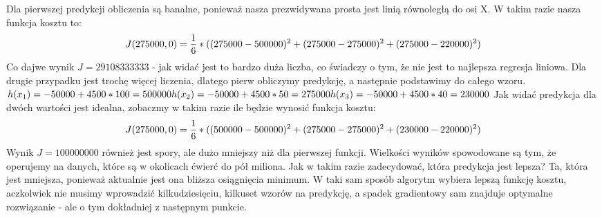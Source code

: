 \newpage
\noindent
Dla pierwszej predykcji obliczenia są banalne, ponieważ nasza prezwidywana prosta jest linią równoległą do osi X. W takim razie nasza funkcja kosztu to:
$$
	J(275000, 0) = \frac{1}{6}*((275000-500000)^{2}+(275000-275000)^{2}+(275000-220000)^{2}) \\
$$
Co dajwe wynik $J = 29 108 333 333$ - jak widać jest to bardzo duża liczba, co świadczy o tym, że nie jest to najlepsza regresja liniowa. Dla drugie przypadku jest trochę więcej liczenia, dlatego pierw obliczymy predykcję, a następnie podstawimy do całego wzoru.\\
\newline
\(
h(x_{1}) = -50000 + 4500 * 100 = 500000\\
h(x_{2}) = -50000 + 4500 * 50 = 275000\\
h(x_{3}) = -50000 + 4500 * 40 = 230000\\
\)
\newline
Jak widać predykcja dla dwóch wartości jest idealna, zobaczmy w takim razie ile będzie wynosić funkcja kosztu:
$$
	J(275000, 0) = \frac{1}{6}*((500000-500000)^{2}+(275000-275000)^{2}+(230000-220000)^{2}) \\
$$
Wynik $J = 100 000 000$ również jest spory, ale dużo mniejszy niż dla pierwszej funkcji. Wielkości wyników spowodowane są tym, że operujemy na danych, które są w okolicach ćwierć do pół miliona. Jak w takim razie zadecydować, która predykcja jest lepsza? Ta, która jest mniejsza, ponieważ aktualnie jest ona bliższa osiągnięcia minimum. W taki sam sposób algorytm wybiera lepszą funkcję kosztu, aczkolwiek nie musimy wprowadzić kilkudziesięciu, kilkuset wzorów na predykcję, a spadek gradientowy sam znajduje optymalne rozwiązanie - ale o tym dokładniej z następnym punkcie.